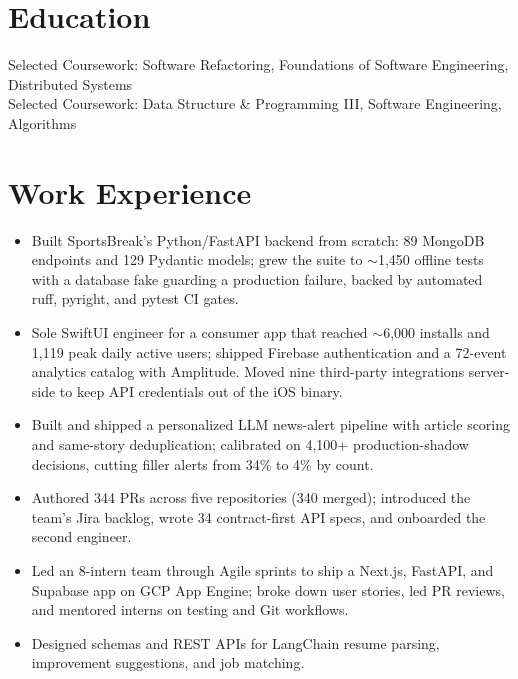 \documentclass[11pt, letterpaper]{article}
\begin{document}

\section{Education}
Selected Coursework: Software Refactoring, Foundations of Software Engineering, Distributed Systems\\[1pt]
Selected Coursework: Data Structure \& Programming III, Software Engineering, Algorithms

\section{Work Experience}
\begin{itemize}
  \item Built SportsBreak's Python/FastAPI backend from scratch: 89 MongoDB endpoints and 129 Pydantic models; grew the suite to $\sim$1{,}450 offline tests with a database fake guarding a production failure, backed by automated ruff, pyright, and pytest CI gates.
  \item Sole SwiftUI engineer for a consumer app that reached $\sim$6{,}000 installs and 1{,}119 peak daily active users; shipped Firebase authentication and a 72-event analytics catalog with Amplitude. Moved nine third-party integrations server-side to keep API credentials out of the iOS binary.
  \item Built and shipped a personalized LLM news-alert pipeline with article scoring and same-story deduplication; calibrated on 4{,}100+ production-shadow decisions, cutting filler alerts from 34\% to 4\% by count.
  \item Authored 344 PRs across five repositories (340 merged); introduced the team's Jira backlog, wrote 34 contract-first API specs, and onboarded the second engineer.
\end{itemize}

\begin{itemize}
  \item Led an 8-intern team through Agile sprints to ship a Next.js, FastAPI, and Supabase app on GCP App Engine; broke down user stories, led PR reviews, and mentored interns on testing and Git workflows.
  \item Designed schemas and REST APIs for LangChain resume parsing, improvement suggestions, and job matching.
\end{itemize}
\end{document}
